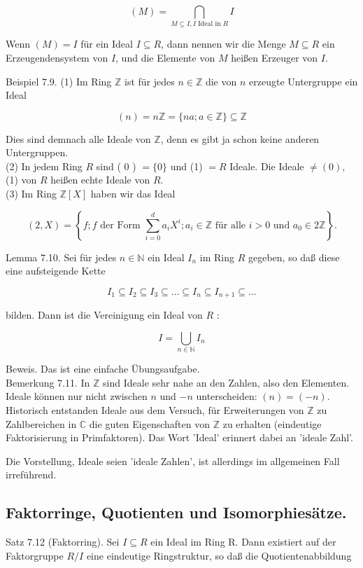 \documentclass[10pt, letterpaper]{article}
\begin{document}
$$
(M)=\bigcap_{M \subseteq I, I \text { Ideal in } R} I
$$

Wenn $(M)=I$ für ein Ideal $I \subseteq R$, dann nennen wir die Menge $M \subseteq R$ ein Erzeugendensystem von $I$, und die Elemente von $M$ heißen Erzeuger von $I$.

Beispiel 7.9. (1) Im Ring $\mathbb{Z}$ ist für jedes $n \in \mathbb{Z}$ die von $n$ erzeugte Untergruppe ein Ideal

$$
(n)=n \mathbb{Z}=\{n a ; a \in \mathbb{Z}\} \subseteq \mathbb{Z}
$$

Dies sind demnach alle Ideale von $\mathbb{Z}$, denn es gibt ja schon keine anderen Untergruppen.\\
(2) In jedem Ring $R$ sind ( 0 ) $=\{0\}$ und (1) $=R$ Ideale. Die Ideale $\neq(0)$, (1) von $R$ heißen echte Ideale von $R$.\\
(3) Im Ring $\mathbb{Z}[X]$ haben wir das Ideal

$$
(2, X)=\left\{f ; f \text { der Form } \sum_{i=0}^{d} a_{i} X^{i} ; a_{i} \in \mathbb{Z} \text { für alle } i>0 \text { und } a_{0} \in 2 \mathbb{Z}\right\} .
$$

Lemma 7.10. Sei für jedes $n \in \mathbb{N}$ ein Ideal $I_{n}$ im Ring $R$ gegeben, so daß diese eine aufsteigende Kette

$$
I_{1} \subseteq I_{2} \subseteq I_{3} \subseteq \ldots \subseteq I_{n} \subseteq I_{n+1} \subseteq \ldots
$$

bilden. Dann ist die Vereinigung ein Ideal von $R$ :

$$
I=\bigcup_{n \in \mathbb{N}} I_{n}
$$

Beweis. Das ist eine einfache Übungsaufgabe.\\
Bemerkung 7.11. In $\mathbb{Z}$ sind Ideale sehr nahe an den Zahlen, also den Elementen. Ideale können nur nicht zwischen $n$ und $-n$ unterscheiden: $(n)=(-n)$. Historisch entstanden Ideale aus dem Versuch, für Erweiterungen von $\mathbb{Z}$ zu Zahlbereichen in $\mathbb{C}$ die guten Eigenschaften von $\mathbb{Z}$ zu erhalten (eindeutige Faktorisierung in Primfaktoren). Das Wort 'Ideal' erinnert dabei an 'ideale Zahl'.

Die Vorstellung, Ideale seien 'ideale Zahlen', ist allerdings im allgemeinen Fall irreführend.

\subsection*{Faktorringe, Quotienten und Isomorphiesätze.}
Satz 7.12 (Faktorring). Sei $I \subseteq R$ ein Ideal im Ring R. Dann existiert auf der Faktorgruppe $R / I$ eine eindeutige Ringstruktur, so daß die Quotientenabbildung
\end{document}
